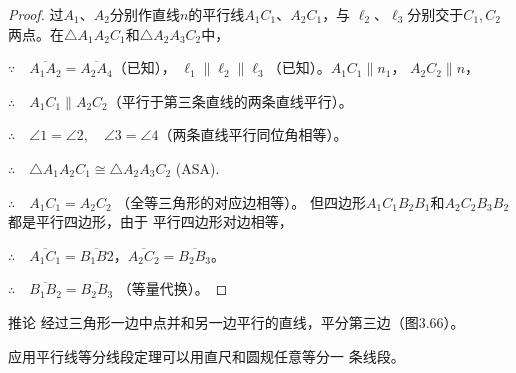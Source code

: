 \begin{proof}
过$A_1$、$A_2$分别作直线$n$的平行线$A_1C_1$、$A_2C_1$，与
$\ell_2$、$\ell_3$分别交于$C_1,C_2$两点。在$\triangle A_1A_2C_1$和$\triangle A_2A_3C_2$中，

$\because\quad \overline{A_1A_2}= \overline{A_2A_4}$（已知），
$\ell_1\parallel \ell_2\parallel \ell_3$（已知）。$A_1C_1\parallel n_1$， $A_2C_2\parallel n$，

$\therefore\quad A_1C_1\parallel A_2C_2$（平行于第三条直线的两条直线平行）。

$\therefore\quad \angle 1=\angle 2,\quad \angle 3=\angle 4$（两条直线平行同位角相等）。

$\therefore\quad \triangle A_1A_2C_1\cong \triangle A_2A_3C_2$ (ASA).

$\therefore\quad A_1C_1=A_2C_2$ （全等三角形的对应边相等）。
但四边形$A_1C_1B_2B_1$和$A_2C_2B_3B_2$都是平行四边形，由于
平行四边形对边相等，

$\therefore\quad \overline{A_1C_1}=\overline{B_1B2}$，$\overline{A_2C_2}=\overline{B_2B_3}$。

$\therefore\quad \overline{B_1B_2}=\overline{B_2B_3}$ （等量代换）。
\end{proof}    

\begin{Deduction}{推论}
经过三角形一边中点并和另一边平行的直线，平分第三边（图3.66）。
\end{Deduction}

应用平行线等分线段定理可以用直尺和圆规任意等分一
条线段。

\begin{figure}
    \begin{minipage}[t]{0.48\linewidth}
    \centering
\begin{tikzpicture}[>=latex, scale=1]
    \end{tikzpicture}
    \caption{}
    \end{minipage}
    \begin{minipage}[t]{0.48\linewidth}
    \centering
    \begin{tikzpicture}[>=latex, scale=1]

    \end{tikzpicture}
    \caption{}
    \end{minipage}
    \end{figure}

